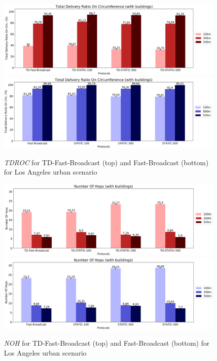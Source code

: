 		\begin{figure}[H]
			\centering
			\includegraphics[width=1.0\textwidth]{immagini/td-fb-la/td-fb/tdroc}	
			\includegraphics[width=1.0\textwidth]{immagini/td-fb-la/fb/tdroc}
			\caption{\textit{TDROC} for TD-Fast-Broadcast (top) and Fast-Broadcast (bottom) for Los Angeles urban scenario}
			\label{fig:la-td-tdroc}
		\end{figure}
				
		\begin{figure}[H]
			\centering
			\includegraphics[width=1.0\textwidth]{immagini/td-fb-la/td-fb/noh}	
			\includegraphics[width=1.0\textwidth]{immagini/td-fb-la/fb/noh}
			\caption{\textit{NOH} for TD-Fast-Broadcast (top) and Fast-Broadcast (bottom) for Los Angeles urban scenario}
			\label{fig:la-td-noh}
		\end{figure}
					
